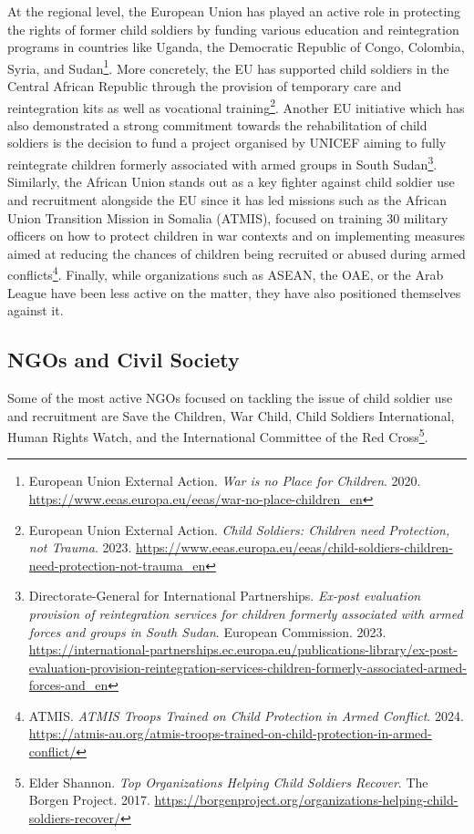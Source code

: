 At the regional level, the European Union has played an active role in protecting the rights of former child soldiers by funding various education and reintegration programs in countries like Uganda, the Democratic Republic of Congo, Colombia, Syria, and Sudan\footnote{European Union External Action. \emph{War is no Place for Children}. 2020. \url{https://www.eeas.europa.eu/eeas/war-no-place-children_en}}. More concretely, the EU has supported child soldiers in the Central African Republic through the provision of temporary care and reintegration kits as well as vocational training\footnote{European Union External Action. \emph{Child Soldiers: Children need Protection, not Trauma}. 2023. \url{https://www.eeas.europa.eu/eeas/child-soldiers-children-need-protection-not-trauma_en}}. Another EU initiative which has also demonstrated a strong commitment towards the rehabilitation of child soldiers is the decision to fund a project organised by UNICEF aiming to fully reintegrate children formerly associated with armed groups in South Sudan\footnote{Directorate-General for International Partnerships. \emph{Ex-post evaluation provision of reintegration services for children formerly associated with armed forces and groups in South Sudan}. European Commission. 2023. \url{https://international-partnerships.ec.europa.eu/publications-library/ex-post-evaluation-provision-reintegration-services-children-formerly-associated-armed-forces-and_en}}. Similarly, the African Union stands out as a key fighter against child soldier use and recruitment alongside the EU since it has led missions such as the African Union Transition Mission in Somalia (ATMIS), focused on training 30 military officers on how to protect children in war contexts and on implementing measures aimed at reducing the chances of children being recruited or abused during armed conflicts\footnote{ATMIS. \emph{ATMIS Troops Trained on Child Protection in Armed Conflict}. 2024. \url{https://atmis-au.org/atmis-troops-trained-on-child-protection-in-armed-conflict/}}. Finally, while organizations such as ASEAN, the OAE, or the Arab League have been less active on the matter, they have also positioned themselves against it.

\subsection{NGOs and Civil Society}

Some of the most active NGOs focused on tackling the issue of child soldier use and recruitment are Save the Children, War Child, Child Soldiers International, Human Rights Watch, and the International Committee of the Red Cross\footnote{Elder Shannon. \emph{Top Organizations Helping Child Soldiers Recover}. The Borgen Project. 2017. \url{https://borgenproject.org/organizations-helping-child-soldiers-recover/}}.

